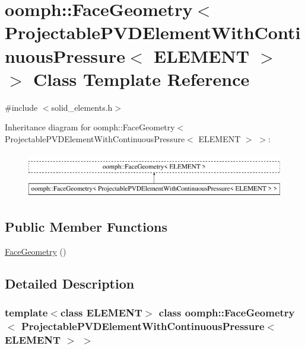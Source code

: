 \hypertarget{classoomph_1_1FaceGeometry_3_01ProjectablePVDElementWithContinuousPressure_3_01ELEMENT_01_4_01_4}{}\section{oomph\+:\+:Face\+Geometry$<$ Projectable\+P\+V\+D\+Element\+With\+Continuous\+Pressure$<$ E\+L\+E\+M\+E\+NT $>$ $>$ Class Template Reference}
\label{classoomph_1_1FaceGeometry_3_01ProjectablePVDElementWithContinuousPressure_3_01ELEMENT_01_4_01_4}


{\ttfamily \#include $<$solid\+\_\+elements.\+h$>$}

Inheritance diagram for oomph\+:\+:Face\+Geometry$<$ Projectable\+P\+V\+D\+Element\+With\+Continuous\+Pressure$<$ E\+L\+E\+M\+E\+NT $>$ $>$\+:\begin{figure}[H]
\begin{center}
\leavevmode
\includegraphics[height=2.000000cm]{classoomph_1_1FaceGeometry_3_01ProjectablePVDElementWithContinuousPressure_3_01ELEMENT_01_4_01_4}
\end{center}
\end{figure}
\subsection*{Public Member Functions}
\begin{DoxyCompactItemize}
\item 
\hyperlink{classoomph_1_1FaceGeometry_3_01ProjectablePVDElementWithContinuousPressure_3_01ELEMENT_01_4_01_4_a9f774e966a9830f7763dcc95d555084b}{Face\+Geometry} ()
\end{DoxyCompactItemize}


\subsection{Detailed Description}
\subsubsection*{template$<$class E\+L\+E\+M\+E\+NT$>$\newline
class oomph\+::\+Face\+Geometry$<$ Projectable\+P\+V\+D\+Element\+With\+Continuous\+Pressure$<$ E\+L\+E\+M\+E\+N\+T $>$ $>$}

